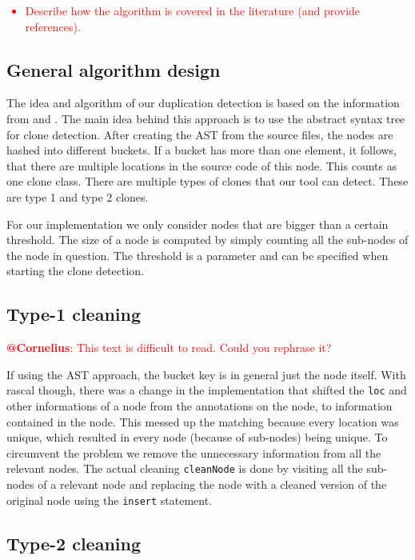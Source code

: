 \documentclass{uva-inf-article}
\newcommand\todo[1]{\textcolor{red}{#1}}
\begin{document}
\todo {
	\begin{itemize}
		\item{Describe how the algorithm is covered in the literature (and provide references).}
	\end{itemize}
}

\subsection{General algorithm design}

The idea and algorithm of our duplication detection is based on the
information from \cite{lazar2014clone} and \cite{baxter1998clone}. 
The main idea behind this approach is to use the abstract syntax tree for clone detection.
After creating the AST from the source files, the nodes are hashed into different buckets.
If a bucket has more than one element, it follows, that there are multiple locations in the source code of this node.
This counts as one clone class. There are multiple types of clones that our tool can detect.
These are type 1 and type 2 clones.

For our implementation we only consider nodes that are bigger than a certain threshold. The size of a node is computed by simply counting all the sub-nodes of the node in question. The threshold is a parameter and can be specified when starting the clone detection.

\subsection{Type-1 cleaning}

\todo{\textbf{@Cornelius}: This text is difficult to read. Could you rephrase it?}

If using the AST approach, the bucket key is in general just the node itself. 
With rascal though, there was a change in the implementation that shifted the \texttt{loc} and other informations of a node from the annotations on the node, to information contained in the node.
This messed up the matching because every location was unique, which resulted in every node (because of sub-nodes) being unique. 
To circumvent the problem we remove the unnecessary information from all the relevant nodes. The actual cleaning \texttt{cleanNode} is done
by visiting all the sub-nodes of a relevant node and replacing the node with a cleaned version of the original node using the \texttt{insert} statement.

\subsection{Type-2 cleaning}
\end{document}
